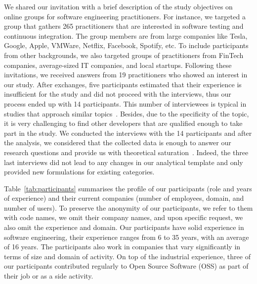We shared our invitation with a brief description of the study objectives on online groups for software engineering practitioners.
For instance, we targeted a group that gathers 265 practitioners that are interested in software testing and continuous integration.
The group members are from large companies like Tesla, Google, Apple, VMWare, Netflix, Facebook, Spotify, etc.
To include participants from other backgrounds, we also targeted groups of practitioners from FinTech companies, average-sized IT companies, and local startups.
Following these invitations, we received answers from 19 practitioners who showed an interest in our study.
After exchanges, five participants estimated that their experience is insufficient for the study and did not proceed with the interviews, thus our process ended up with 14 participants.
This number of interviewees is typical in studies that approach similar topics~\cite{tomasdottir2017and,8999994}.
Besides, due to the specificity of the topic, it is very challenging to find other developers that are qualified enough to take part in the study.
We conducted the interviews with the 14 participants and after the analysis, we considered that the collected data is enough to answer our research questions and provide us with theoretical saturation~\cite{glaser2007remodeling}.
Indeed, the three last interviews did not lead to any changes in our analytical template and only provided new formulations for existing categories.

Table~\ref{tab:participants} summarises the profile of our participants (role and years of experience) and their current companies (number of employees, domain, and number of users).
To preserve the anonymity of our participants, we refer to them with code names, we omit their company names, and upon specific request, we also omit the experience and domain.
Our participants have solid experience in software engineering, their experience ranges from 6 to 35 years, with an average of 16 years.
The participants also work in companies that vary significantly in terms of size and domain of activity.
On top of the industrial experience, three of our participants contributed regularly to Open Source Software (OSS) as part of their job or as a side activity.


